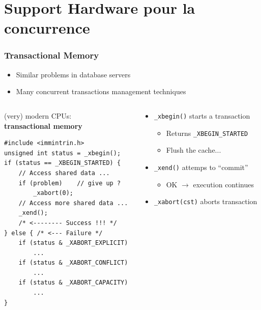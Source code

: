 \documentclass[xcolor={x11names,svgnames},x11names,svgnames]{beamer}
\begin{document}

\section{Support Hardware pour la concurrence}

\begin{frame}[fragile=singleslide, label=rtm]
  \frametitle{Transactional Memory}

  \begin{itemize}
  \item Similar problems in database servers
  \item Many concurrent transactions management techniques
  \end{itemize}

  \begin{columns}
    \begin{column}{0.5\textwidth}
  \begin{alertblock}{(very) modern CPUs:\\ \textbf{transactional memory}}
    \vspace*{-2ex}
    \begin{verbatim}
#include <immintrin.h>
unsigned int status = _xbegin();
if (status == _XBEGIN_STARTED) {
    // Access shared data ...
    if (problem)    // give up ?
        _xabort(0); 
    // Access more shared data ...
    _xend();
    /* <-------- Success !!! */
} else { /* <--- Failure */
    if (status & _XABORT_EXPLICIT)
        ...
    if (status & _XABORT_CONFLICT)
        ...    
    if (status & _XABORT_CAPACITY)
        ...
}
\end{verbatim}
  \end{alertblock}
\end{column}
\begin{column}{0.6\textwidth}
  \begin{itemize}
  \item \texttt{_xbegin()} starts a transaction
    \begin{itemize}
    \item Returns \texttt{_XBEGIN_STARTED}
    \item Flush the cache...
    \end{itemize}
  \item \texttt{_xend()} attemps to ``commit''
    \begin{itemize}
    \item OK $\rightarrow$ execution continues
    \end{itemize}
  \item \texttt{_xabort(cst)} aborts transaction


\end{itemize}
\end{column}
\end{columns}
\end{frame}
\end{document}
